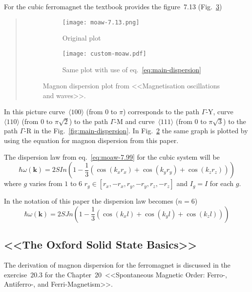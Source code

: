     For the cubic ferromagnet the textbook provides the figure~7.13 (Fig.~\ref{fig:moaw-7.13})
    \begin{quote}
        \begin{figure}[H]
            \centering
            \begin{subfigure}[b]{0.49\textwidth}
                \centering
                \texttt{[image: moaw-7.13.png]}
                \caption{Original plot}
                \label{fig:moaw-7.13-original}
            \end{subfigure}
            \hfill
            \begin{subfigure}[b]{0.49\textwidth}
                \centering
                \texttt{[image: custom-moaw.pdf]}
                \caption{Same plot with use of eq.~\eqref{eq:main-dispersion}}
                \label{fig:moaw-7.13-custom}
            \end{subfigure}
            \hfill
            \caption{Magnon dispersion plot from <<Magnetisation oscillations and waves>>.}
            \label{fig:moaw-7.13}
        \end{figure}
    \end{quote}
    In this picture curve~$\langle 100\rangle$ (from $0$ to $\pi$) corresponds to the path $\Gamma$-Y, 
    curve~$\langle 110\rangle$ (from $0$ to $\pi\sqrt{2}$) to the path $\Gamma$-M and
    curve~$\langle 111\rangle$ (from $0$ to $\pi\sqrt{3}$) to the path $\Gamma$-R 
    in the Fig.~\ref{fig:main-dispersion}. In Fig.~\ref{fig:moaw-7.13-custom} the same graph is plotted by using the equation for magnon dispersion from this paper.

    The dispersion law from eq.~\ref{eq:moaw-7.99} for the cubic system will be
    \begin{equation}
        \hbar\omega(\mathbf{k}) = 2SIn\left(1 - \dfrac{1}{3}\left(\cos(k_xr_x) + \cos(k_yr_y) + \cos(k_zr_z)\right)\right)
    \end{equation}
    where $g$ varies from $1$ to $6$ $r_g \in [r_x, -r_x, r_y, -r_y, r_z, -r_z]$ and $I_g = I$ for each $g$. 

    In the notation of this paper the dispersion law becomes ($n = 6$)
    \begin{equation}
        \hbar\omega(\mathbf{k}) = 2SJn\left(1 - \dfrac{1}{3}\left(\cos(k_xl) + \cos(k_yl) + \cos(k_zl)\right)\right)
    \end{equation}

\subsection{<<The Oxford Solid State Basics>>\cite{simon2013oxford}}
    The derivation of magnon dispersion for the ferromagnet is discussed in the exercise~$20.3$ for the Chapter~$20$~<<Spontaneous Magnetic Order: Ferro-, Antiferro-, and Ferri-Magnetism>>.

